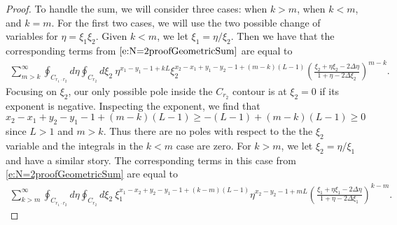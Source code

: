 \documentclass[10pt,a4paper]{amsart}
\begin{document}
\begin{proof}
To handle the sum, we will consider three cases: when $k>m$, when $k<m$, and $k=m$. For the first two cases, we will use the two possible change of variables for $\eta=\xi_1\xi_2$. Given $k<m$, we let $\xi_1=\eta/\xi_2$. Then we have that the corresponding terms from $\eqref{e:N=2proofGeometricSum}$ are equal to 
\begin{equation}
    \begin{split}
        \sum_{m>k}^\infty\oint_{C_{r_1\cdot r_2}}d\eta\oint_{C_{r_2}}d\xi_2 \ \eta^{x_1-y_1-1+kL}\xi_2^{x_2-x_1+y_1-y_2-1+(m-k)(L-1)}\left( \frac{\xi_2+\eta\xi_2-2\Delta\eta}{1+\eta-2\Delta\xi_2} \right)^{m-k}.
    \end{split}
\end{equation}
Focusing on $\xi_2$, our only possible pole inside the $C_{r_2}$ contour is at $\xi_2=0$ if its exponent is negative. Inspecting the exponent, we find that 
\begin{equation}
    x_2-x_1+y_2-y_1-1+(m-k)(L-1)\geq -(L-1)+(m-k)(L-1)\geq 0
\end{equation}
since $L>1$ and $m>k$. Thus there are no poles with respect to the the $\xi_2$ variable and the integrals in the $k<m$ case are zero. For $k>m$, we let $\xi_2=\eta/\xi_1$ and have a similar story. The corresponding terms in this case from \eqref{e:N=2proofGeometricSum} are equal to 
\begin{equation}
    \begin{split}
        \sum_{k>m}^\infty\oint_{C_{r_1\cdot r_2}}d\eta\oint_{C_{r_2}}d\xi_2 \ \xi_1^{x_1-x_2+y_2-y_1-1+(k-m)(L-1)}\eta^{x_2-y_2-1+mL}\left( \frac{\xi_1+\eta\xi_1-2\Delta\eta}{1+\eta-2\Delta\xi_1} \right)^{k-m}.
    \end{split}
\end{equation}


\end{proof}
\end{document}
